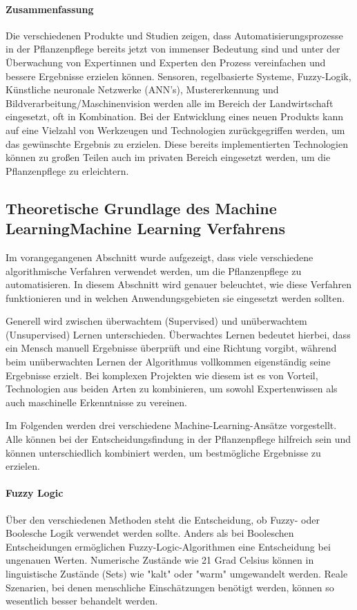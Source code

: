 \paragraph{Zusammenfassung}
Die verschiedenen Produkte und Studien zeigen, dass Automatisierungsprozesse in der Pflanzenpflege bereits jetzt von immenser Bedeutung sind und unter der Überwachung von Expertinnen und Experten den Prozess vereinfachen und bessere Ergebnisse erzielen können. Sensoren, regelbasierte Systeme, Fuzzy-Logik, Künstliche neuronale Netzwerke (ANN's), Mustererkennung und Bildverarbeitung/Maschinenvision werden alle im Bereich der Landwirtschaft eingesetzt, oft in Kombination. Bei der Entwicklung eines neuen Produkts kann auf eine Vielzahl von Werkzeugen und Technologien zurückgegriffen werden, um das gewünschte Ergebnis zu erzielen. Diese bereits implementierten Technologien können zu großen Teilen auch im privaten Bereich eingesetzt werden, um die Pflanzenpflege zu erleichtern.

\subsection{Theoretische Grundlage des Machine Learning\gls{Machine Learning} Verfahrens}
Im vorangegangenen Abschnitt wurde aufgezeigt, dass viele verschiedene algorithmische Verfahren verwendet werden, um die Pflanzenpflege zu automatisieren. In diesem Abschnitt wird genauer beleuchtet, wie diese Verfahren funktionieren und in welchen Anwendungsgebieten sie eingesetzt werden sollten.

Generell wird zwischen überwachtem (Supervised) und unüberwachtem (Unsupervised) Lernen unterschieden. Überwachtes Lernen bedeutet hierbei, dass ein Mensch manuell Ergebnisse überprüft und eine Richtung vorgibt, während beim unüberwachten Lernen der Algorithmus vollkommen eigenständig seine Ergebnisse erzielt. Bei komplexen Projekten wie diesem ist es von Vorteil, Technologien aus beiden Arten zu kombinieren, um sowohl Expertenwissen als auch maschinelle Erkenntnisse zu vereinen.

Im Folgenden werden drei verschiedene Machine-Learning-Ansätze vorgestellt. Alle können bei der Entscheidungsfindung in der Pflanzenpflege hilfreich sein und können unterschiedlich kombiniert werden, um bestmögliche Ergebnisse zu erzielen.

\paragraph{Fuzzy Logic}
Über den verschiedenen Methoden steht die Entscheidung, ob Fuzzy- oder Boolesche Logik verwendet werden sollte. Anders als bei Booleschen Entscheidungen ermöglichen Fuzzy-Logic-Algorithmen eine Entscheidung bei ungenauen Werten. Numerische Zustände wie 21 Grad Celsius können in linguistische Zustände (Sets) wie "kalt" oder "warm" umgewandelt werden.\cite{lameres1998fuzzy} Reale Szenarien, bei denen menschliche Einschätzungen benötigt werden, können so wesentlich besser behandelt werden.

